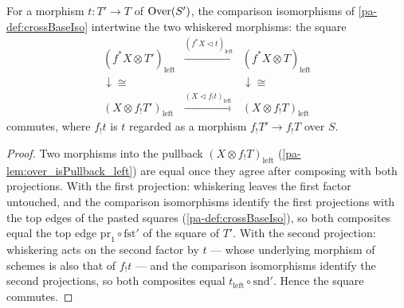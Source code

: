 \begin{theorem}
  \label{pa-thm:crossBaseIso_naturality}
  \leanok

  For a morphism \(t : T' \to T\) of \(\mathrm{Over}(S')\), the comparison isomorphisms of
  \ref{pa-def:crossBaseIso} intertwine the two whiskered morphisms: the square
  \[
    \begin{array}{ccc}
      (f^{*}X \otimes T')_{\mathrm{left}} &
        \xrightarrow{(f^{*}X \lhd t)_{\mathrm{left}}} &
        (f^{*}X \otimes T)_{\mathrm{left}} \\
      \downarrow \cong & & \downarrow \cong \\
      (X \otimes f_{!}T')_{\mathrm{left}} &
        \xrightarrow{(X \lhd f_{!}t)_{\mathrm{left}}} &
        (X \otimes f_{!}T)_{\mathrm{left}}
    \end{array}
  \]
  commutes, where \(f_{!}t\) is \(t\) regarded as a morphism \(f_{!}T' \to f_{!}T\)
  over \(S\).
\end{theorem}
\begin{proof}
  \leanok
  Two morphisms into the pullback \((X \otimes f_{!}T)_{\mathrm{left}}\)
  (\ref{pa-lem:over_isPullback_left}) are equal once they agree after composing with both
  projections. With the first projection: whiskering leaves the first factor untouched,
  and the comparison isomorphisms identify the first projections with the top edges of
  the pasted squares (\ref{pa-def:crossBaseIso}), so both composites equal the top edge
  \(\mathrm{pr}_1 \circ \mathrm{fst}'\) of the square of \(T'\). With the second
  projection: whiskering acts on the second factor by \(t\) --- whose underlying
  morphism of schemes is also that of \(f_{!}t\) --- and the comparison isomorphisms
  identify the second projections, so both composites equal
  \(t_{\mathrm{left}} \circ \mathrm{snd}'\). Hence the square commutes.
\end{proof}

